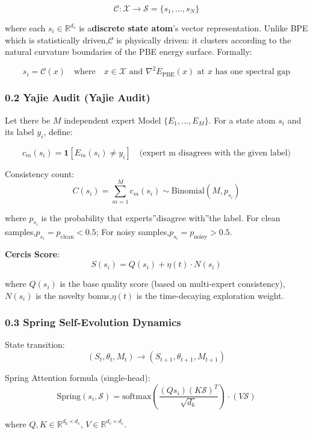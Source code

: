 \documentclass[
  12pt,
]{article}
\begin{document}
\[\mathcal{C}: \mathcal{X} \to \mathcal{S} = \{s_1, \ldots, s_N\}\]

where each \(s_i \in \mathbb{R}^{d_s}\)
is a\textbf{discrete state atom}'s vector representation. Unlike BPE
which is statistically driven,\(\mathcal{C}\) is physically driven: it clusters according to the natural curvature boundaries of the PBE
energy surface. Formally:

\[s_i = \mathcal{C}(x) \quad \text{where} \quad x \in \mathcal{X} \text{ and  } \nabla^2 E_{\text{PBE}}(x) \text{ at  } x \text{ has one spectral gap}\]

\subsubsection{0.2 Yajie Audit (Yajie
Audit)}\label{ux96c5ux6d01ux5ba1ux8ba1yajie-audit}

Let there be \(M\) independent expert Model \(\{E_1, \ldots, E_M\}\). For a state atom \(s_i\)
and its label \(y_i\), define:

\[c_m(s_i) = \mathbf{1}[E_m(s_i) \neq y_i] \quad \text{(expert m disagrees with the given label)}\]

Consistency count:
\[C(s_i) = \sum_{m=1}^{M} c_m(s_i) \sim \text{Binomial}(M, p_{s_i})\]

where \(p_{s_i}\)
is the probability that experts''disagree with''the label. For clean samples,\(p_{s_i} = p_{\text{clean}} < 0.5\); For noisy samples,\(p_{s_i} = p_{\text{noisy}} > 0.5\). 

\textbf{Cercis Score}: \[S(s_i) = Q(s_i) + \eta(t) \cdot N(s_i)\]

where \(Q(s_i)\) is the base quality score (based on multi-expert consistency),\(N(s_i)\)
is the novelty bonus,\(\eta(t)\) is the time-decaying exploration weight.

\subsubsection{0.3 Spring
Self-Evolution Dynamics}\label{spring-ux81eaux8fdbux5316ux52a8ux529bux5b66}

State transition: \[(S_t, \theta_t, M_t) \to (S_{t+1}, \theta_{t+1}, M_{t+1})\]

Spring Attention formula (single-head):
\[\text{Spring}(s_i, \mathcal{S}) = \text{softmax}\left(\frac{(Q s_i)(K \mathcal{S})^T}{\sqrt{d_k}}\right) \cdot (V \mathcal{S})\]

where
\(Q, K \in \mathbb{R}^{d_k \times d_s}\), \(V \in \mathbb{R}^{d_v \times d_s}\). 
\end{document}
